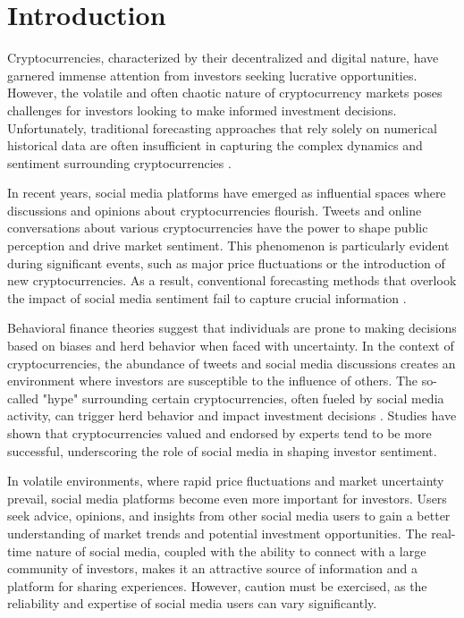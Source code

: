\documentclass[]{ceurart}
\begin{document}
\maketitle

\section{Introduction}
Cryptocurrencies, characterized by their decentralized and digital nature, have garnered immense attention from investors seeking lucrative opportunities. However, the volatile and often chaotic nature of cryptocurrency markets poses challenges for investors looking to make informed investment decisions. Unfortunately, traditional forecasting approaches that rely solely on numerical historical data are often insufficient in capturing the complex dynamics and sentiment surrounding cryptocurrencies \cite{sawhney-etal-2022-tweet}.

In recent years, social media platforms have emerged as influential spaces where discussions and opinions about cryptocurrencies flourish. Tweets and online conversations about various cryptocurrencies have the power to shape public perception and drive market sentiment. This phenomenon is particularly evident during significant events, such as major price fluctuations or the introduction of new cryptocurrencies. As a result, conventional forecasting methods that overlook the impact of social media sentiment fail to capture crucial information \cite{sawhney-etal-2021-fast}.

Behavioral finance theories suggest that individuals are prone to making decisions based on biases and herd behavior when faced with uncertainty. In the context of cryptocurrencies, the abundance of tweets and social media discussions creates an environment where investors are susceptible to the influence of others. The so-called "hype" surrounding certain cryptocurrencies, often fueled by social media activity, can trigger herd behavior and impact investment decisions \cite{sawhney-etal-2022-tweet}. Studies have shown that cryptocurrencies valued and endorsed by experts tend to be more successful, underscoring the role of social media in shaping investor sentiment.

In volatile environments, where rapid price fluctuations and market uncertainty prevail, social media platforms become even more important for investors. Users seek advice, opinions, and insights from other social media users to gain a better understanding of market trends and potential investment opportunities. The real-time nature of social media, coupled with the ability to connect with a large community of investors, makes it an attractive source of information and a platform for sharing experiences. However, caution must be exercised, as the reliability and expertise of social media users can vary significantly.
\end{document}
